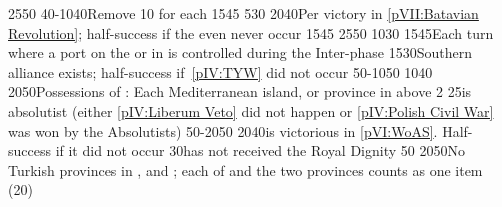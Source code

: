 %
{25}{50}{\EU@objNoActNavigation}%
%
%
%
%
\EU@objWoSS%
%
{40-10}{40}{Remove 10 \VPs for each \EU@objEastMalacca}%
\EUobjective{}{\continentAmerica}{\COL}%
{15}{45}{\EU@objAmericaHOL}%
%
%
%
%
{5}{30}{\EU@objMonopolyZone}%
%
{20}{40}{Per victory in \ref{pVII:Batavian Revolution}; half-success if the
  even never occur}%
%
\EUobjective{}{\continentAmerica}{\COL}%
{15}{45}{\EU@objAmericaHOL}%
%
%
%
%
%
%
{25}{50}{\EU@objGermanEmpire}%
%
{10}{30}{\EU@objBigAustria}%
%
{15}{45}{Each turn where a port on the \regionBaltique or in
  \payshanse is controlled during the Inter-phase}%
%
{15}{30}{Southern \HRE alliance exists; half-success if~\ref{pIV:TYW} did not
  occur}%
%
%
%
{50-10}{50}{}%
%
{10}{40}{\EU@objSpanishNetherlands}%
%
{20}{50}{Possessions of : Each Mediterranean island, or province
  in  above 2}%
%
%
{}{25}{\paysmajeurPologne is absolutist (either \ref{pIV:Liberum Veto} did not
happen or \ref{pIV:Polish Civil War} was won by the Absolutists)}%
%
%
%
{50-20}{50}{}%
\EU@objWoSS%
%
{20}{40}{\AUS is victorious in \ref{pVI:WoAS}. Half-success if it did not
  occur}%
%
{}{30}{\paysmajeurPrusse has not received the Royal Dignity}%
%
{}{50}{\EU@objSilesie}%
%
%
%
{20}{50}{No Turkish provinces in \payshongrie, \provinceBosna and
  \provinceSerbia; each of \payshongrie and the two provinces counts as one
  item (20\VPs)}%
